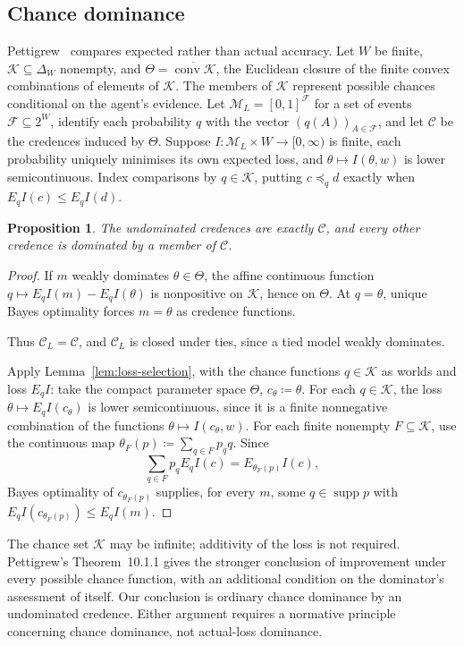 \documentclass[11pt]{article}
\newtheorem{proposition}[theorem]{Proposition}
\theoremstyle{definition}
\theoremstyle{remark}
\newcommand{\M}{\mathcal M}
\newcommand{\C}{\mathcal C}
\newcommand{\supp}{\operatorname{supp}}
\begin{document}
\subsection{Chance dominance}\label{sec:chance}
Pettigrew~\cite[Chapter~10]{Pettigrew2016} compares expected rather than actual accuracy. Let $W$ be finite, $\mathcal K\subseteq\Delta_W$ nonempty, and $\Theta=\overline{\operatorname{conv}\mathcal K}$, the Euclidean closure of the finite convex combinations of elements of $\mathcal K$. The members of $\mathcal K$ represent possible chances conditional on the agent's evidence. Let $\M_L=[0,1]^{\mathcal F}$ for a set of events $\mathcal F\subseteq2^W$, identify each probability $q$ with the vector $(q(A))_{A\in\mathcal F}$, and let $\C$ be the credences induced by $\Theta$. Suppose $I:\M_L\times W\to[0,\infty)$ is finite, each probability uniquely minimises its own expected loss, and $\theta\mapsto I(\theta,w)$ is lower semicontinuous. Index comparisons by $q\in\mathcal K$, putting $c\preceq_q d$ exactly when $E_qI(c)\le E_qI(d)$.
\begin{proposition}\label{prop:short-chance}
The undominated credences are exactly $\C$, and every other credence is dominated by a member of $\C$.
\end{proposition}
\begin{proof}
If $m$ weakly dominates $\theta\in\Theta$, the affine continuous function $q\mapsto E_qI(m)-E_qI(\theta)$ is nonpositive on $\mathcal K$, hence on $\Theta$. At $q=\theta$, unique Bayes optimality forces $m=\theta$ as credence functions. {\color{red}Thus $\C_L=\C$, and $\C_L$ is closed under ties, since a tied model weakly dominates.

Apply Lemma~\ref{lem:loss-selection}, with the chance functions $q\in\mathcal K$ as worlds and loss $E_qI$: take the compact parameter space $\Theta$, $c_\theta\coloneqq\theta$. For each $q\in\mathcal K$, the loss $\theta\mapsto E_qI(c_\theta)$ is lower semicontinuous, since it is a finite nonnegative combination of the functions $\theta\mapsto I(c_\theta,w)$. For each finite nonempty $F\subseteq\mathcal K$, use the continuous map $\theta_F(p)\coloneqq\sum_{q\in F}p_qq$. Since
\[
\sum_{q\in F}p_qE_qI(c)=E_{\theta_F(p)}I(c),
\]
Bayes optimality of $c_{\theta_F(p)}$ supplies, for every $m$, some $q\in\supp p$ with $E_qI(c_{\theta_F(p)})\le E_qI(m)$.}
\end{proof}
The chance set $\mathcal K$ may be infinite; additivity of the loss is not required. Pettigrew's Theorem~10.1.1 gives the stronger conclusion of improvement under every possible chance function, with an additional condition on the dominator's assessment of itself. Our conclusion is ordinary chance dominance by an undominated credence. Either argument requires a normative principle concerning chance dominance, not actual-loss dominance.




\end{document}
